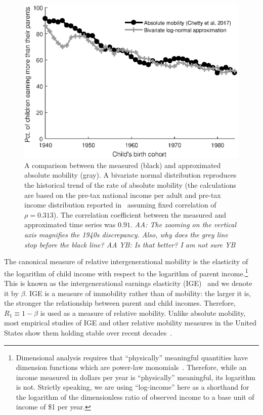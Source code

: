 \documentclass[12pt,a4paper]{article}
\newcommand{\red}[1]{{\color{red} #1}}
\newcommand{\blue}[1]{{\color{blue} #1}}
\newcommand{\AAA}[1]{\red{{\it AA: #1 AA}}}
\newcommand{\YB}[1]{\blue{{\it YB: #1 YB}}}
\newcommand{\flabel}[1]{\label{fig:#1}}
\numberwithin{equation}{section}
\begin{document}
\begin{figure}[!htb]
\centering
\includegraphics[width=1.0\textwidth] {./figs/trend_nozoom.eps}
\caption{A comparison between the measured (black) and approximated absolute mobility (gray). A bivariate normal distribution reproduces the historical trend of the rate of absolute mobility (the calculations are based on the pre-tax national income per adult and pre-tax income distribution reported in~\citet{WID2017} assuming fixed correlation of $\rho=0.313$). The correlation coefficient between the measured and approximated time series was $0.91$. \AAA{The zooming on the vertical axis magnifies the 1940s discrepancy. Also, why does the grey line stop before the black line?} \YB{Is that better? I am not sure}
}
\flabel{trend}
\end{figure}

The canonical measure of relative intergenerational mobility is the elasticity of the logarithm of child income with respect to the logarithm of parent income.\footnote{Dimensional analysis requires that ``physically'' meaningful quantities have dimension functions which are power-law monomials~\citep{barenblatt2003}. Therefore, while an income measured in dollars per year is ``physically'' meaningful, its logarithm is not. Strictly speaking, we are using ``log-income'' here as a shorthand for the logarithm of the dimensionless ratio of observed income to a base unit of income of \$1 per year.} This is known as the intergenerational earnings elasticity (IGE)~\citep{mulligan1997parental,lee2009trends,chetty2014land} and we denote it by $\beta$. IGE is a measure of immobility rather than of mobility: the larger it is, the stronger the relationship between parent and child incomes. Therefore, $R_1 \equiv 1-\beta$ is used as a measure of relative mobility. Unlike absolute mobility, most empirical studies of IGE and other relative mobility measures in the United States show them holding stable over recent decades~\citep{lee2009trends,hauser2010intergenerational,chetty2014land,chetty2014united}. 
\end{document}
